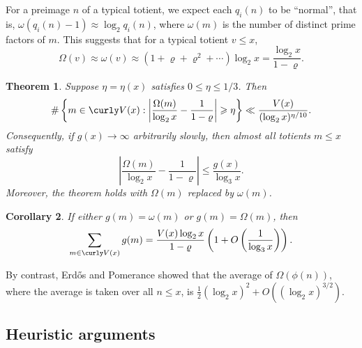 \documentclass[11pt]{amsart}
\theoremstyle{remark}
\theoremstyle{plain}
\newtheorem{thm}{Theorem}
\newtheorem{cor}[thm]{Corollary}
\numberwithin{equation}{section}
\renewcommand{\(}{\left(}
\renewcommand{\)}{\right)}
\newcommand{\fancyV}{\curly V}
\renewcommand{\le}{\leqslant}
\renewcommand{\ge}{\geqslant}
\renewcommand{\rho}{\varrho}
\newcommand{\om}{\Omega}
\begin{document}
For a preimage $n$ of a typical totient,
we expect each $q_i(n)$ to be ``normal'', that is, $\omega(q_i(n)-1) \approx
\log_2 q_i(n)$, where $\omega(m)$ is the number of distinct prime factors of $m$.
This suggests that for a typical totient $v\le x$,
$$
\Omega(v) \approx \omega(v) \approx (1+\rho+\rho^2+\cdots)\log_2 x = \frac{\log_2 x}{1-\rho}.
$$

\begin{thm}\label{Omega normal}
Suppose $\eta=\eta(x)$ satisfies $0\le \eta \le 1/3$.  Then
$$
\# \left\{ m\in \fancyV(x) :
 \left| \frac{\om(m)}{\log_2 x} - \frac{1}{1-\rho} \right| \ge
\eta \right\} \ll \frac{V(x)}{(\log_2 x)^{\eta/10}}.
$$
Consequently, if $g(x)\to\infty$ arbitrarily
slowly, then almost all totients $m\le x$ satisfy
$$
\left| \frac{\om(m)}{\log_2 x} - \frac1{1-\rho} \right| \le \frac{g(x)}
{\log_3 x}.
$$
Moreover, the theorem holds with $\om(m)$ replaced by $\omega(m)$.
\end{thm}

\begin{cor}\label{Omega normal cor} 
If either $g(m)=\omega(m)$ or $g(m)=\om(m)$, then
$$
\sum_{m\in \fancyV(x)} g(m) = \frac{V(x)\log_2 x}{1-\rho} \( 1 + O \(
\frac1{\log_3 x} \) \).
$$
\end{cor}

By contrast, Erd\H os and Pomerance \cite{EP} showed that the average
of $\om(\phi(n))$, where the average is taken over all $n\le x$, is
$\frac12 (\log_2 x)^2 + O((\log_2 x)^{3/2})$.



\subsection{Heuristic arguments}
\end{document}
